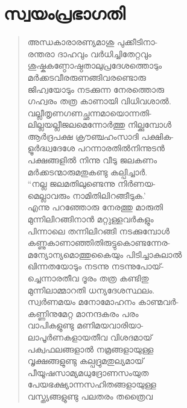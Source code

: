 
\section{സ്വയംപ്രഭാഗതി}

\begin{verse}
അന്ധകാരാരണ്യമാശു പുക്കീടിനാ-\\
രന്തരാ ദാഹവും വര്‍ധിച്ചിതേറ്റവും\\
ശുഷ്കകണ്ഠോഷ്ഠതാലുപ്രദേശത്തൊടും\\
മര്‍ക്കടവീരരുണങ്ങിവരണ്ടൊരു\\
ജിഹ്വയോടും നടക്കുന്ന നേരത്തൊരു\\
ഗഹ്വരം തത്ര കാണായി വിധിവശാല്‍.\\
വല്ലീതൃണഗണച്ഛന്നമായൊന്നതി-\\
ലില്ലയല്ലീജലമെന്നോര്‍ത്തു നില്ക്കുമ്പോള്‍\\
ആര്‍ദ്രപക്ഷ ക്രൗഞ്ചഹംസാദി പക്ഷിക-\\
ളൂര്‍ദ്ധ്വദേശേ പറന്നാരതില്‍നിന്നുടന്‍\\
പക്ഷങ്ങളില്‍ നിന്നു വീടു ജലകണം\\
മര്‍ക്കടന്മാരുമതുകണ്ടു കല്പിച്ചാര്‍.\\
“നല്ല ജലമതിലുണ്ടെന്നു നിര്‍ണയ-\\
മെല്ലാവരും നാമിതിലിറങ്ങീടുക.’\\
എന്നു പറഞ്ഞോരു നേരത്തു മാരുതി\\
മുന്നിലിറങ്ങിനാന്‍ മറ്റുള്ളവര്‍കളും\\
പിന്നാലെ തന്നിലിറങ്ങി നടക്കുമ്പോള്‍\\
കണ്ണുകാണാഞ്ഞിതിരുട്ടുകൊണ്ടന്നേര-\\
മന്യോന്യമൊത്തുകൈയും പിടിച്ചാകുലാല്‍\\
ഖിന്നതയോടും നടന്നു നടന്നുപോയ്-\\
ച്ചെന്നാരതീവ ദൂരം തത്ര കണ്ടിതു\\
മുന്നിലാമ്മാറതി ധന്യദേശസ്ഥലം.\\
സ്വര്‍ണമയം മനോമോഹനം കാണ്മവര്‍-\\
കണ്ണിനുമേറ്റ മാനന്ദകരം പരം\\
വാപികളുണ്ടു മണിമയവാരിയാ-\\
ലാപൂര്‍ണകളായതീവ വിശദമായ്\\
പക്വഫലങ്ങളാല്‍ നമ്രങ്ങളായുള്ള\\
വൃക്ഷങ്ങളുണ്ടു കല്പദ്രുമതുല്യമായ്\\
പീയൂഷസാമ്യമധുദ്രോണസംയുത\\
പേയഭക്ഷ്യാന്നസഹിതങ്ങളായുള്ള\\
വസ്ത്യങ്ങളുണ്ടു പലതരം തത്രൈവ\\

\end{verse}
